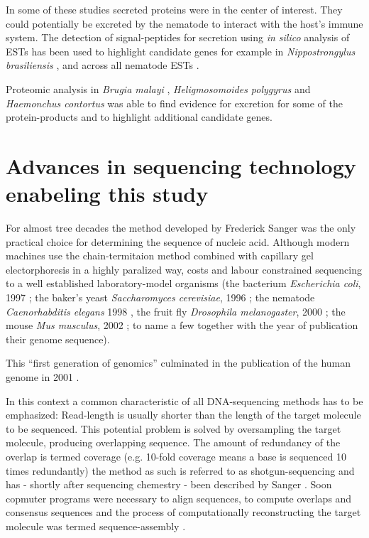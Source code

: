 In some of these studies secreted proteins were in the center of
interest. They could potentially be excreted by the nematode to
interact with the host's immune system. The detection of
signal-peptides for secretion using \textit{in silico} analysis of
ESTs has been used to highlight candidate genes for example in
\textit{Nippostrongylus brasiliensis} \cite{harcus_signal_2004}, and
across all nematode ESTs \cite{nagaraj_needles_2008}.

Proteomic analysis in \textit{Brugia malayi}
\cite{pmid19352421,pmid18958170}, \textit{Heligmosomoides polygyrus}
\cite{pmid21722761} and \textit{Haemonchus contortus}
\cite{pmid12576473} was able to find evidence for excretion for some
of the protein-products and to highlight additional candidate genes.


\section{Advances in sequencing technology enabeling this study}
\label{ad-seq}

For almost tree decades the method developed by Frederick Sanger
\cite{pmid271968} was the only practical choice for determining the
sequence of nucleic acid. Although modern machines use the
chain-termitaion method combined with capillary gel electorphoresis
\cite{pmid2326186} in a highly paralized way, costs and labour
constrained sequencing to a well established laboratory-model
organisms (the bacterium \textit{Escherichia coli}, 1997
\cite{pmid9278503}; the baker's yeast \textit{Saccharomyces
  cerevisiae}, 1996 \cite{pmid8849441}; the nematode
\textit{Caenorhabditis elegans} 1998 \cite{pmid9851916}, the fruit fly
\textit{Drosophila melanogaster}, 2000 \cite{adams2000genome}; the
mouse \textit{Mus musculus}, 2002 \cite{pmid12466850}; to name a few
together with the year of publication their genome sequence).

This ``first generation of genomics'' culminated in the publication of
the human genome in 2001 \cite{pmid11181995}.


In this context a common characteristic of all DNA-sequencing methods
has to be emphasized: Read-length is usually shorter than the length
of the target molecule to be sequenced. This potential problem is
solved by oversampling the target molecule, producing overlapping
sequence. The amount of redundancy of the overlap is termed coverage
(e.g. 10-fold coverage means a base is sequenced 10 times redundantly)
the method as such is referred to as shotgun-sequencing and has -
shortly after sequencing chemestry - been described by Sanger
\cite{pmid6260957}. Soon copmuter programs were necessary to align
sequences, to compute overlaps and consensus sequences
\cite{pmid461197} and the process of computationally reconstructing
the target molecule was termed sequence-assembly \cite{pmid6251542}.

